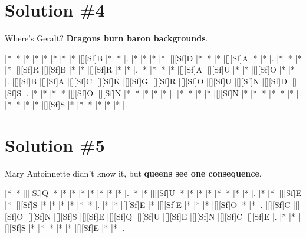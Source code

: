 \documentclass[letterpaper]{article}
\begin{document}
\newpage
\section*{Solution \#4}
Where's Geralt?
\newline\textbf{Dragons burn baron backgrounds}.

\vspace*{1em}
\begin{Puzzle}{11}{8}
|*        |*        |*        |*        |*        |*        |*        |*        |[][Sf]B  |*        |*        |. 
|*        |*        |*        |*        |[][Sf]D  |*        |*        |*        |[][Sf]A  |*        |*        |.  
|*        |*        |*        |*        |[][Sf]R  |[][Sf]B  |*        |*        |[][Sf]R  |*        |*        |.
|*        |*        |*        |*        |[][Sf]A  |[][Sf]U  |*        |*        |[][Sf]O  |*        |*        |.  
|[][Sf]B  |[][Sf]A  |[][Sf]C  |[][Sf]K  |[][Sf]G  |[][Sf]R  |[][Sf]O  |[][Sf]U  |[][Sf]N  |[][Sf]D  |[][Sf]S  |.
|*        |*        |*        |*        |[][Sf]O  |[][Sf]N  |*        |*        |*        |*        |*        |. 
|*        |*        |*        |*        |[][Sf]N  |*        |*        |*        |*        |*        |*        |.
|*        |*        |*        |*        |[][Sf]S  |*        |*        |*        |*        |*        |*        |.
\end{Puzzle}

\newpage
\section*{Solution \#5}
Mary Antoinnette didn't know it, but \textbf{queens see one consequence}.

\vspace*{1em}
\begin{Puzzle}{11}{6}
|*        |*        |[][Sf]Q  |*        |*        |*        |*        |*        |*        |*        |*        |. 
|*        |*        |[][Sf]U  |*        |*        |*        |*        |*        |*        |*        |*        |.  
|*        |*        |[][Sf]E  |*        |[][Sf]S  |*        |*        |*        |*        |*        |*        |.
|*        |*        |[][Sf]E  |*        |[][Sf]E  |*        |*        |*        |[][Sf]O  |*        |*        |.  
|[][Sf]C  |[][Sf]O  |[][Sf]N  |[][Sf]S  |[][Sf]E  |[][Sf]Q  |[][Sf]U  |[][Sf]E  |[][Sf]N  |[][Sf]C  |[][Sf]E  |.
|*        |*        |[][Sf]S  |*        |*        |*        |*        |*        |[][Sf]E  |*        |*        |.
\end{Puzzle}
\end{document}
